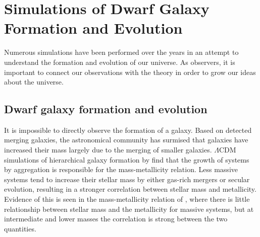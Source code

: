 \chapter[Simulations]{Simulations of Dwarf Galaxy Formation and Evolution}


Numerous simulations have been performed over the years in an attempt to 
understand the formation and evolution of our universe.  As observers, it is 
important to connect our observations with the theory in order to grow our ideas 
about the universe.


\section{Dwarf galaxy formation and evolution}

It is impossible to directly observe the formation of a galaxy.  Based on 
detected merging galaxies, the astronomical community has surmised that galaxies 
have increased their mass largely due to the merging of smaller galaxies.  
$\Lambda$CDM simulations of hierarchical galaxy formation by \cite{deRossi07} 
find that the growth of systems by aggregation is responsible for the 
mass-metallicity relation.  Less massive systems tend to increase their stellar 
mass by either gas-rich mergers or secular evolution, resulting in a stronger 
correlation between stellar mass and metallicity.  Evidence of this is seen in 
the mass-metallicity relation of \cite{Tremonti04}, where there is little 
relationship between stellar mass and the metallicity for massive systems, but 
at intermediate and lower masses the correlation is strong between the two 
quantities.

